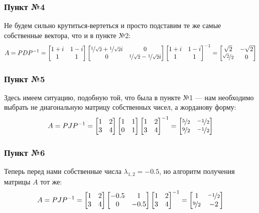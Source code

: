 \documentclass[a3paper,14pt]{extarticle}
\begin{document}
\subsubsection*{Пункт №4}
Не будем сильно крутиться-вертеться и просто подставим те же самые собственные вектора, что и в пункте №2:
$$A = PDP^{-1} = \begin{bmatrix}
    1+i & 1-i \\ 1 & 1
\end{bmatrix}\begin{bmatrix}
    \nicefrac{1}{\sqrt{2}}+\nicefrac{1}{\sqrt{2}}i & 0 \\ 0 & \nicefrac{1}{\sqrt{2}}-\nicefrac{1}{\sqrt{2}}i
\end{bmatrix}\begin{bmatrix}
    1+i & 1-i \\ 1 & 1
\end{bmatrix}^{-1} = \begin{bmatrix}
    \sqrt{2} & -\sqrt{2} \\ \nicefrac{\sqrt{2}}{2} & 0
\end{bmatrix}$$
\subsubsection*{Пункт №5}
Здесь имеем ситуацию, подобную той, что была в пункте №1 --- нам необходимо выбрать не диагональную матрицу собственных чисел, а жорданову форму:
$$A = PJP^{-1} = \begin{bmatrix}
    1 & 2 \\ 3 & 4
\end{bmatrix}\begin{bmatrix}
    1 & 1 \\ 0 & 1
\end{bmatrix}\begin{bmatrix}
    1 & 2 \\ 3 & 4
\end{bmatrix}^{-1} = \begin{bmatrix}
    \nicefrac{5}{2} & \nicefrac{-1}{2} \\
    \nicefrac{9}{2} & \nicefrac{-1}{2}
\end{bmatrix}$$
\subsubsection*{Пункт №6}
Теперь перед нами собственные числа $\lambda_{1,2} = -0.5$, но алгоритм получения матрицы $A$ тот же:
$$A = PJP^{-1} = \begin{bmatrix}
    1 & 2 \\ 3 & 4
\end{bmatrix}\begin{bmatrix}
    -0.5 & 1 \\ 0 & -0.5
\end{bmatrix}\begin{bmatrix}
    1 & 2 \\ 3 & 4
\end{bmatrix}^{-1} = \begin{bmatrix}
    1 & \nicefrac{-1}{2} \\
    \nicefrac{9}{2} & -2
\end{bmatrix}$$
\end{document}
